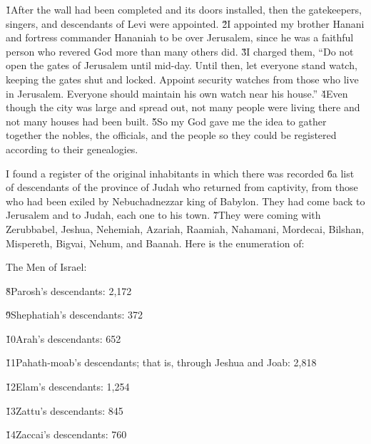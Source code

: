 \v{1}After the wall had been completed and its doors installed, then the gatekeepers, singers, and descendants of Levi were appointed. \v{2}I appointed my brother Hanani and fortress commander Hananiah to be over Jerusalem, since he was a faithful person who revered God more than many others did. \v{3}I charged them, ``Do not open the gates of Jerusalem until mid-day. Until then, let everyone stand watch, keeping the gates shut and locked. Appoint security watches from those who live in Jerusalem. Everyone should maintain his own watch near his house.'' \v{4}Even though the city was large and spread out, not many people were living there and not many houses had been built. \v{5}So my God gave me the idea to gather together the nobles, the officials, and the people so they could be registered according to their genealogies.

I found a register of the original inhabitants in which there was recorded \v{6}a list of descendants of the province of Judah who returned from captivity, from those who had been exiled by Nebuchadnezzar king of Babylon. They had come back to Jerusalem and to Judah, each one to his town. \v{7}They were coming with Zerubbabel, Jeshua, Nehemiah, Azariah, Raamiah, Nahamani, Mordecai, Bilshan, Mispereth, Bigvai, Nehum, and Baanah. Here is the enumeration of:

The Men of Israel:

\v{8}Parosh's descendants: 2,172

\v{9}Shephatiah's descendants: 372

\v{10}Arah's descendants: 652

\v{11}Pahath-moab's descendants; that is, through Jeshua and Joab: 2,818

\v{12}Elam's descendants: 1,254

\v{13}Zattu's descendants: 845

\v{14}Zaccai's descendants: 760

